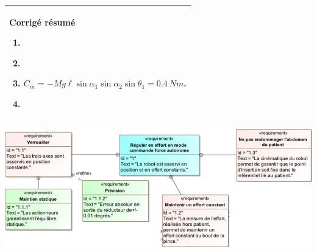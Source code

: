 \documentclass[10pt,fleqn]{article} %
\begin{document}
\begin{multicols}{2}
\fi



\ifprof
\else
\begin{center}
\begin{tabular}{|p{.95\linewidth}|}
\hline
\textbf{Corrigé résumé}
\begin{enumerate}
\item $\quad$
\item $\quad$
\item $C_m=-Mg\ell\sin\alpha_1\sin\alpha_2\sin\theta_1 =\SI{0,4}{Nm}$.
\item $\quad$
\end{enumerate} \\
\hline
\end{tabular}
\end{center}
\fi
\ifprof
\else
\end{multicols}
\fi

\ifprof
\else

\vspace{1cm}
\begin{center}
\includegraphics[width=\linewidth]{images/fig_03}
\end{center}
\fi
\end{document}
